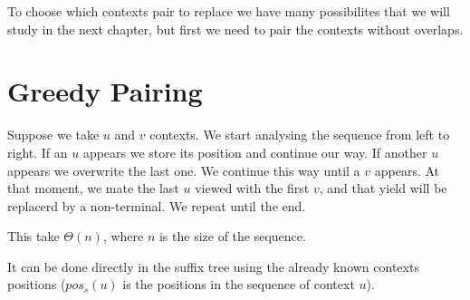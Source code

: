 





To choose which contexts pair to replace we have many possibilites that we will study in the next chapter, but first we need to pair the contexts without overlaps.

\section{Greedy Pairing}

Suppose we take $u$ and $v$ contexts. We start analysing the sequence from left to right. 
If an $u$ appears we store its position and continue our way. If another $u$ appears we overwrite the last one. We continue this way until a $v$ appears. At that moment, we mate the last $u$ viewed with the first $v$, and that yield will be replacerd by a non-terminal. We repeat until the end.

This take $\Theta(n)$, where $n$ is the size of the sequence.

It can be done directly in the suffix tree using the already known contexts positions ($pos_s(u)$ is the positions in the sequence of context $u$). \\

